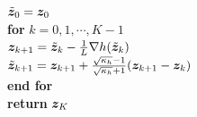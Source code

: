 \documentclass{article}
\begin{document}
\begin{algorithm*}[htbp]  
\caption{AGD $(h,K,  \vz_0)$} \label{alg:AGD}
\begin{algorithmic}[1] 
\STATE $ \tilde {{\bm{z}}}_0 = {\bm{z}}_0$ \\[1mm]
\STATE \textbf{for} $ k =0,1,\cdots,K-1 $ \\[1mm]
\STATE \quad ${\bm{z}}_{k+1} = \tilde {{\bm{z}}}_k - \frac{1}{L} \nabla h(\tilde {{\bm{z}}}_k)$ \\[1mm]
\STATE \quad $\tilde {{\bm{z}}}_{k+1} = {\bm{z}}_{k+1} + \frac{\sqrt{\kappa_h}-1}{\sqrt{\kappa_h} +1} ({\bm{z}}_{k+1} - {\bm{z}}_k) $ \\[1mm]
\STATE \textbf{end for} \\[1mm]
\STATE \textbf{return} ${\bm{z}}_K$ 
\end{algorithmic}
\end{algorithm*}
\end{document}
